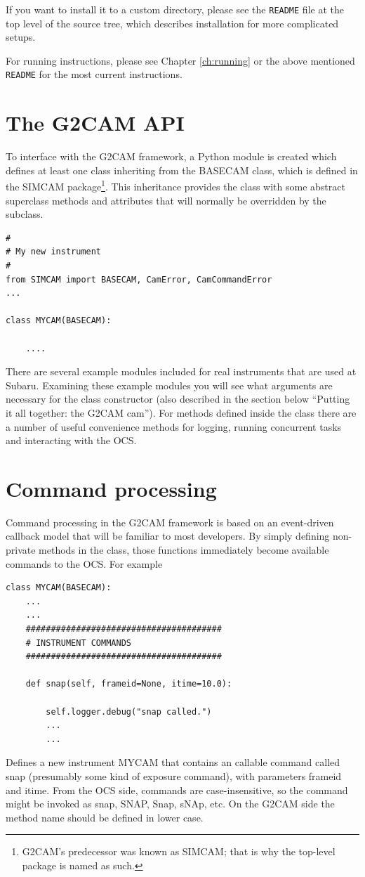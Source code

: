 \documentclass[11pt]{report}
\begin{document}
If you want to install it to a custom directory, please see the
{\tt README} file at the top level of the source tree, which describes
installation for more complicated setups.

For running instructions, please see Chapter \ref{ch:running} or the
above mentioned {\tt README} for the most current instructions.  

\section{The G2CAM API}
To interface with the G2CAM framework, a Python module is created which
defines at least one class inheriting from the BASECAM class, which is
defined in the SIMCAM package\footnote{G2CAM's predecessor was known as
SIMCAM; that is why the top-level package is named as such.}.
This inheritance provides the class with some abstract superclass
methods and attributes that will normally be overridden by the subclass. 

\begin{verbatim}
#
# My new instrument
#
from SIMCAM import BASECAM, CamError, CamCommandError
...

class MYCAM(BASECAM):

    ....

\end{verbatim}
There are several example modules included for real instruments that are
used at Subaru. Examining these example modules you will see what
arguments are necessary for the class constructor (also described in the
section below ``Putting it all together: the G2CAM cam'').
For methods defined inside the class there are a number of useful
convenience methods for logging, running concurrent tasks and
interacting with the OCS. 

\section{Command processing}
Command processing in the G2CAM framework is based on an event-driven
callback model that will be familiar to most developers. By simply
defining non-private methods in the class, those functions immediately
become available commands to the OCS. For example 
\begin{verbatim}
class MYCAM(BASECAM):
    ...
    ...
    #######################################
    # INSTRUMENT COMMANDS
    #######################################

    def snap(self, frameid=None, itime=10.0):

        self.logger.debug("snap called.")
        ...
        ...

\end{verbatim}
Defines a new instrument MYCAM that contains an callable command called
snap (presumably some kind of exposure command), with parameters frameid
and itime. From the OCS side, commands are case-insensitive, so the
command might be invoked as snap, SNAP, Snap, sNAp, etc. 
On the G2CAM side the method name should be defined in lower case. 
\end{document}
